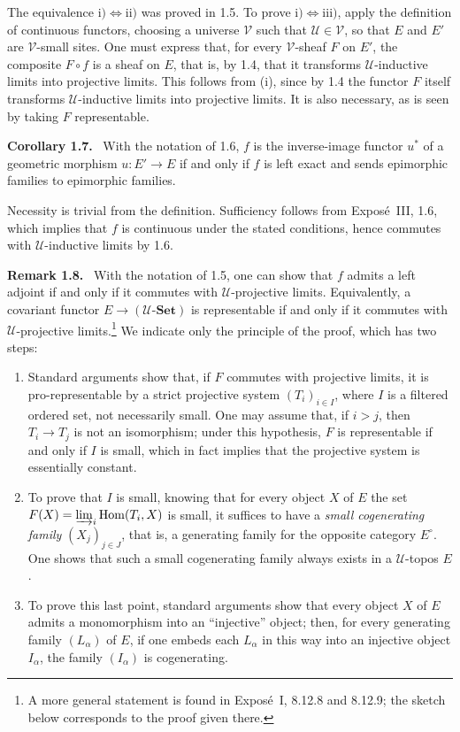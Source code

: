 \documentclass[11pt]{article}
\newcommand{\U}{\mathcal{U}}
\newcommand{\V}{\mathcal{V}}
\newcommand{\Set}{\mathbf{Set}}
\newcommand{\Hom}{\operatorname{Hom}}
\newenvironment{statement}[1]{\par\medskip\noindent\textbf{#1.}\ }{\par\medskip}
\newenvironment{remarktext}[1]{\par\medskip\noindent\textbf{#1.}\ }{\par\medskip}
\begin{document}
The equivalence \(\mathrm{i)}\Leftrightarrow\mathrm{ii)}\) was proved in 1.5. To prove \(\mathrm{i)}\Leftrightarrow\mathrm{iii)}\), apply the definition of continuous functors, choosing a universe \(\V\) such that \(\U\in\V\), so that \(E\) and \(E'\) are \(\V\)-small sites. One must express that, for every \(\V\)-sheaf \(F\) on \(E'\), the composite \(F\circ f\) is a sheaf on \(E\), that is, by 1.4, that it transforms \(\U\)-inductive limits into projective limits. This follows from (i), since by 1.4 the functor \(F\) itself transforms \(\U\)-inductive limits into projective limits. It is also necessary, as is seen by taking \(F\) representable.

\begin{statement}{Corollary 1.7}
With the notation of 1.6, \(f\) is the inverse-image functor \(u^\ast\) of a geometric morphism \(u:E'\to E\) if and only if \(f\) is left exact and sends epimorphic families to epimorphic families.
\end{statement}

Necessity is trivial from the definition. Sufficiency follows from Expos\'e~III, 1.6, which implies that \(f\) is continuous under the stated conditions, hence commutes with \(\U\)-inductive limits by 1.6.

\begin{remarktext}{Remark 1.8}
With the notation of 1.5, one can show that \(f\) admits a left adjoint if and only if it commutes with \(\U\)-projective limits. Equivalently, a covariant functor \(E\to(\U\text{-}\Set)\) is representable if and only if it commutes with \(\U\)-projective limits.\footnote{A more general statement is found in Expos\'e~I, 8.12.8 and 8.12.9; the sketch below corresponds to the proof given there.} We indicate only the principle of the proof, which has two steps:
\begin{enumerate}[label=\alph*)]
\item Standard arguments show that, if \(F\) commutes with projective limits, it is pro-representable by a strict projective system \((T_i)_{i\in I}\), where \(I\) is a filtered ordered set, not necessarily small. One may assume that, if \(i>j\), then \(T_i\to T_j\) is not an isomorphism; under this hypothesis, \(F\) is representable if and only if \(I\) is small, which in fact implies that the projective system is essentially constant.
\item To prove that \(I\) is small, knowing that for every object \(X\) of \(E\) the set \(F(X)=\varinjlim_i\Hom(T_i,X)\) is small, it suffices to have a \emph{small cogenerating family} \((X_j)_{j\in J}\), that is, a generating family for the opposite category \(E^\circ\). One shows that such a small cogenerating family always exists in a \(\U\)-topos \(E\).
\item To prove this last point, standard arguments show that every object \(X\) of \(E\) admits a monomorphism into an ``injective'' object; then, for every generating family \((L_\alpha)\) of \(E\), if one embeds each \(L_\alpha\) in this way into an injective object \(I_\alpha\), the family \((I_\alpha)\) is cogenerating.
\end{enumerate}
\end{remarktext}
\end{document}
